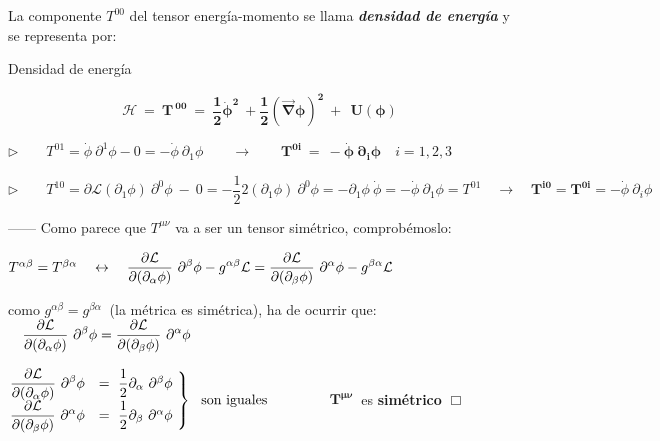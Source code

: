 La componente $T^{00}$ del tensor energía-momento se  llama 	\textbf{\emph{densidad de energía}} y se representa por:

\begin{adjustwidth}{30pt}{30pt}
\begin{myalertblock}{Densidad de energía}
\begin{large}
\begin{equation}
\label{T34dens-energia}	
\boldsymbol{ 
\mathcal H \ = \ T^{\ 00} \ = \  \dfrac 1 2 \dot \phi^2 \ + \dfrac 1 2 (\overrightarrow \nabla \phi)^2 \ + \  \ U(\phi)
}
\end{equation}
\end{large}
\end{myalertblock}
\end{adjustwidth}


\vspace{3mm} $\triangleright \qquad \displaystyle T^{01}=\dot \phi \ \partial^1 \phi - 0 = - \dot \phi \ \partial_1 \phi \qquad \to \qquad \boldsymbol{ T^{0i}\ = \ -\dot \phi \ \partial_i \phi}\quad i=1,2,3$

\vspace{3mm} $\triangleright \qquad \displaystyle T^{10}=\partial{\mathcal L}{(\partial_1 \phi)} \ \partial^0\phi \ - \ 0 = -\dfrac 1 2 2 (\partial_1 \phi)\  \partial^0 \phi =-\partial_1 \phi \ \dot \phi=-\dot \phi \ \partial_1 \phi = T^{01} \quad \to \quad \boldsymbol {T^{i0}=T^{0i}}=-\dot \phi \ \partial_i\phi$


------ Como parece que $T^{\mu \nu}$ va a ser un tensor simétrico, comprobémoslo:

\hspace{.5cm} $T^{\alpha \beta}=T^{\beta \alpha} \quad \leftrightarrow \quad \displaystyle
\pdv{\mathcal L}{(\partial_\alpha \phi)} \ \partial^\beta \phi  - g^{\alpha \beta }  \mathcal L =
\pdv{\mathcal L}{(\partial_\beta \phi)} \ \partial^\alpha \phi  - g^{\beta \alpha }  \mathcal L\ $ 

\hspace{.5cm} como $ g^{\alpha \beta}=g^{\beta \alpha} \ $ (la métrica es simétrica), ha de ocurrir que:
$\quad \displaystyle 
\pdv{\mathcal L}{(\partial_\alpha \phi)} \ \partial^\beta \phi   =
\pdv{\mathcal L}{(\partial_\beta \phi)} \ \partial^\alpha \phi $

\hspace{1.5cm} $\left. \begin{matrix}
 	\displaystyle \pdv{\mathcal L}{(\partial_\alpha \phi)} \ \partial^\beta \phi  &  =\ \dfrac 1 2 \partial_\alpha \ \partial^\beta \phi \ 
 	\\ 
 	\displaystyle \pdv{\mathcal L}{(\partial_\beta \phi)} \ \partial^\alpha \phi  & = \  \dfrac 1 2 \partial_\beta \ \partial^\alpha \phi \ 
 \end{matrix} \right\} \ \text{ son iguales}$ $\qquad \qquad  \boldsymbol{ T^{\mu \nu} }\ $ es \textbf{simétrico} \hspace{2cm} $\Box$


